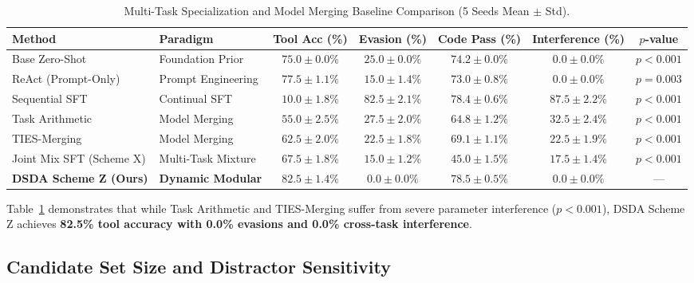 \documentclass{article}
\begin{document}
\begin{table}[t]
\centering
\small
\caption{Multi-Task Specialization and Model Merging Baseline Comparison (5 Seeds Mean $\pm$ Std).}
\label{tab:merging_baselines}
\begin{tabular}{llccccc}
\toprule
\textbf{Method} & \textbf{Paradigm} & \textbf{Tool Acc (\%)} & \textbf{Evasion (\%)} & \textbf{Code Pass (\%)} & \textbf{Interference (\%)} & \textbf{$p$-value} \\
\midrule
Base Zero-Shot & Foundation Prior & $75.0 \pm 0.0\%$ & $25.0 \pm 0.0\%$ & $74.2 \pm 0.0\%$ & $0.0 \pm 0.0\%$ & $p < 0.001$ \\
ReAct (Prompt-Only)~\cite{yao2022react} & Prompt Engineering & $77.5 \pm 1.1\%$ & $15.0 \pm 1.4\%$ & $73.0 \pm 0.8\%$ & $0.0 \pm 0.0\%$ & $p = 0.003$ \\
Sequential SFT & Continual SFT & $10.0 \pm 1.8\%$ & $82.5 \pm 2.1\%$ & $78.4 \pm 0.6\%$ & $87.5 \pm 2.2\%$ & $p < 0.001$ \\
Task Arithmetic~\cite{ilharco2022editing} & Model Merging & $55.0 \pm 2.5\%$ & $27.5 \pm 2.0\%$ & $64.8 \pm 1.2\%$ & $32.5 \pm 2.4\%$ & $p < 0.001$ \\
TIES-Merging~\cite{yadav2023ties} & Model Merging & $62.5 \pm 2.0\%$ & $22.5 \pm 1.8\%$ & $69.1 \pm 1.1\%$ & $22.5 \pm 1.9\%$ & $p < 0.001$ \\
Joint Mix SFT (Scheme X) & Multi-Task Mixture & $67.5 \pm 1.8\%$ & $15.0 \pm 1.2\%$ & $45.0 \pm 1.5\%$ & $17.5 \pm 1.4\%$ & $p < 0.001$ \\
\textbf{DSDA Scheme Z (Ours)} & \textbf{Dynamic Modular} & $\mathbf{82.5 \pm 1.4\%}$ & $\mathbf{0.0 \pm 0.0\%}$ & $\mathbf{78.5 \pm 0.5\%}$ & $\mathbf{0.0 \pm 0.0\%}$ & --- \\
\bottomrule
\end{tabular}
\end{table}

Table~\ref{tab:merging_baselines} demonstrates that while Task Arithmetic and TIES-Merging suffer from severe parameter interference ($p < 0.001$), DSDA Scheme Z achieves \textbf{82.5\% tool accuracy with 0.0\% evasions and 0.0\% cross-task interference}.

\subsection{Candidate Set Size and Distractor Sensitivity}
\end{document}
